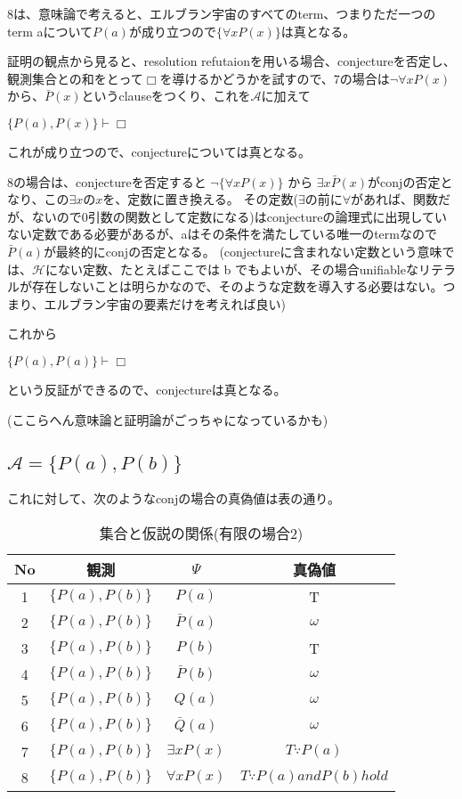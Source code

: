 \documentclass[10pt, oneside]{jarticle}   	%
\theoremstyle{definition}
\newcommand{\undet}{\omega}
\newcommand{\cont}{\Box}
\newcommand{\eset}[1]{\{{#1}\}}
\begin{document}
8は、意味論で考えると、エルブラン宇宙のすべてのterm、つまりただ一つのterm aについて$P(a)$が成り立つので$\{\forall x P(x)\}$は真となる。

証明の観点から見ると、resolution refutaionを用いる場合、conjectureを否定し、観測集合との和をとって$\cont$を導けるかどうかを試すので、7の場合は$\neg \forall x P(x)$から、$\bar P(x)$というclauseをつくり、これを$\mathcal{A}$に加えて

$\{P(a), P(x)\} \vdash \cont$ 

これが成り立つので、conjectureについては真となる。

8の場合は、conjectureを否定すると $\neg \{\forall x P(x)\}$ から $\exists x \bar P(x)$がconjの否定となり、この$\exists x$の$x$を、定数に置き換える。
その定数($\exists$の前に$\forall$があれば、関数だが、ないので0引数の関数として定数になる)はconjectureの論理式に出現していない定数である必要があるが、aはその条件を満たしている唯一のtermなので $\bar P(a)$が最終的にconjの否定となる。
(conjectureに含まれない定数という意味では、$\mathcal{H}$にない定数、たとえばここでは b でもよいが、その場合unifiableなリテラルが存在しないことは明らかなので、そのような定数を導入する必要はない。つまり、エルブラン宇宙の要素だけを考えれば良い)

これから

$\eset{P(a), P(a)} \vdash \cont$ 

という反証ができるので、conjectureは真となる。

(ここらへん意味論と証明論がごっちゃになっているかも)


\subsection{$\mathcal{A}=\eset{P(a), P(b)}$}
これに対して、次のようなconjの場合の真偽値は表の通り。

\begin{table}[htbp]
 \centering
 \begin{tabular}{|c|c|c|c|}\hline
   No & 観測 & $\Psi$ & 真偽値 \\ \hline
   1 & $\eset{P(a), P(b)}$ & $P(a)$ & T \\ \hline
   2 & $\eset{P(a), P(b)}$ & $\bar P(a)$ & $\undet$  \\ \hline
   3 & $\eset{P(a), P(b)}$ & $P(b)$ & T \\ \hline
   4 & $\eset{P(a), P(b)}$ & $\bar P(b)$ & $\undet$  \\ \hline
   5 & $\eset{P(a), P(b)}$ & $Q(a)$ & $\undet$ \\ \hline
   6 & $\eset{P(a), P(b)}$ & $\bar Q(a)$ & $\undet$ \\ \hline
   7 & $\eset{P(a), P(b)}$ & $\exists x P(x)$ & $T \because P(a)$ \\ \hline
   8 & $\eset{P(a), P(b)}$ & $\forall x P(x)$ & $T \because  P(a) and P(b) hold$ \\ \hline
 \end{tabular}
 \caption{集合と仮説の関係(有限の場合2)}
 \label{tab:ex2}
\end{table}
\end{document}
